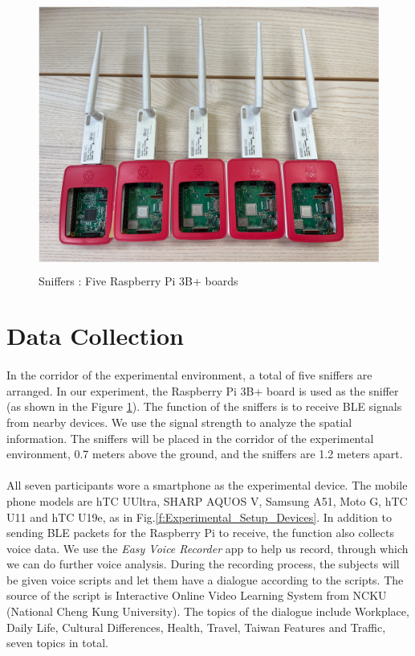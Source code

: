\documentclass[a4paper,12pt]{report}
\begin{document}
\begin{figure}[btph]
\begin{center}
\includegraphics[width=4.66in,height=3.5in]{images and data/Experimental_Setup_Sniffers_Yun.jpg}
\caption{Sniffers : Five Raspberry Pi 3B+ boards}
\label{f:Experimental_Setup_Sniffers}
\end{center}
\end{figure}
\section{Data Collection}
\paragraph{}
In the corridor of the experimental environment, a total of five sniffers are arranged. In our experiment, the Raspberry Pi 3B+ board is used as the sniffer (as shown in the Figure \ref{f:Experimental_Setup_Sniffers}). The function of the sniffers is to receive BLE signals from nearby devices. We use the signal strength to analyze the spatial information. The sniffers will be placed in the corridor of the experimental environment, 0.7 meters above the ground, and the sniffers are 1.2 meters apart.

\paragraph{}
All seven participants wore a smartphone as the experimental device. The mobile phone models are hTC UUltra, SHARP AQUOS V, Samsung A51, Moto G, hTC U11 and hTC U19e, as in Fig.\ref{f:Experimental_Setup_Devices}. In addition to sending BLE packets for the Raspberry Pi to receive, the function also collects voice data. We use the \emph{Easy Voice Recorder} app to help us record, through which we can do further voice analysis. During the recording process, the subjects will be given voice scripts and let them have a dialogue according to the scripts. The source of the script is Interactive Online Video Learning System from NCKU (National Cheng Kung University). The topics of the dialogue include Workplace, Daily Life, Cultural Differences, Health, Travel, Taiwan Features and Traffic, seven topics in total.
\end{document}
